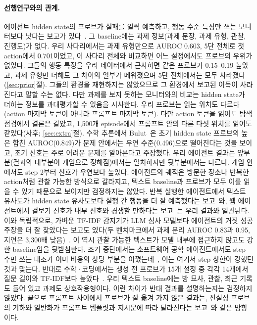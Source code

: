 \documentclass[11pt]{article}
\begin{document}
\paragraph{선행연구와의 관계.} 에이전트 hidden state의 프로브가 실패를 일찍 예측하고, 행동 수준 특징만 쓰는 모니터보다 낫다는 보고가 있다~\cite{ruan2026doomed}.
그 baseline에는 과제 정보(과제 문장, 과제 유형, 관찰, 진행도)가 없다. 우리 사다리에서는 과제 유형만으로 AUROC 0.603, 5단 전체로 첫 action에서 0.701이었고,
이 사다리 전체와 비교하면 어느 설정에서도 프로브의 우위가 없었다. 그들의 행동 특징을 우리 데이터에서 근사하면 같은 프로브가 0.15--0.19 높았고, 과제 유형만 더해도 그 차이의 일부가 메워졌으며 5단 전체에서는 모두 사라졌다(\ref{sec:prior}절). 그들의 환경을 재현하지는 않았으므로 그 환경에서 보고된 이득이 사라진다고 말할 수는 없다. 다만 과제를 보지 못하는 모니터와의 비교는 hidden state가 더하는 정보를 과대평가할 수 있음을 시사한다. 우리 프로브는 읽는 위치도 다르다(action 마지막 토큰이 아니라 프롬프트 마지막 토큰). 다만 action 토큰을 읽어도 탐색 점검에서 결론은 같았고, 1,500개 episode에서 프롬프트 안의 다른 다섯 위치를 읽어도 같았다(사후; \ref{sec:extra}절).
수학 추론에서 Bulut~\cite{bulut2026problem}은 초기 hidden state 프로브의 높은 합친 AUROC(0.849)가 문제 안에서는 우연 수준(0.496)으로 떨어진다는 것을 보이고, 초기 신호는 주로 어려운 문제를 알아본다고 주장했다.
우리 에이전트 결과는 앞부분(결과의 대부분이 게임으로 정해짐)에서는 일치하지만 뒷부분에서는 다르다. 게임 안에서도 step 2부터 신호가 우연보다 높았다. 에이전트의 궤적은 방문한 장소나 반복한 action처럼 관찰 가능한 방식으로 갈라지고,
텍스트 baseline과 프로브가 모두 이를 읽을 수 있기 때문으로 보이지만 검정하지는 않았다.
반복 실행한 에이전트에서 텍스트 유사도가 hidden state 유사도보다 실행 간 행동을 더 잘 예측했다는 보고~\cite{mehta2026commit}와, 웹 에이전트에서 겉보기 신호가 내부 신호와 경쟁할 만하다는 보고~\cite{pan2026monitoring}는 우리 결과와 일관된다. 이와 독립적으로, 가벼운 TF-IDF 감지기가 LLM 심사 모델보다 에이전트의 거짓 성공 주장을 더 잘 찾았다는 보고도 있다(두 벤치마크에서 과제 분리 AUROC 0.83과 0.95, 지연은 3,300배 낮음)~\cite{advani2026false}. 이 역시 관찰 가능한 텍스트가 모델 내부에 접근하지 않고도 강한 baseline임을 뒷받침한다.
조기 중단에서는 소프트웨어 공학 에이전트에서도 step 수만 쓰는 대조가 이미 비용의 상당 부분을 아꼈는데~\cite{wang2026failfast}, 이는 여기서 step 상한이 강했던 것과 맞는다.
반대로 수학·코딩에서는 생성 전 프로브가 15개 설정 중 각각 14개에서 질문 길이와 TF-IDF보다 높았다~\cite{lugoloobi2026failures}. 우리 텍스트 baseline에는 방 묘사, 관찰, 최근 기록도 들어 있고 과제도 상호작용형이다. 이런 차이가 반대 결과를 설명하는지는 검정하지 않았다.
끝으로 프롬프트 사이에서 프로브가 잘 옮겨 가지 않은 결과는, 진실성 프로브의 기하와 일반화가 프롬프트 템플릿과 지시문에 따라 달라진다는 보고~\cite{poulis2026truth}와 같은 방향이다.
\end{document}
